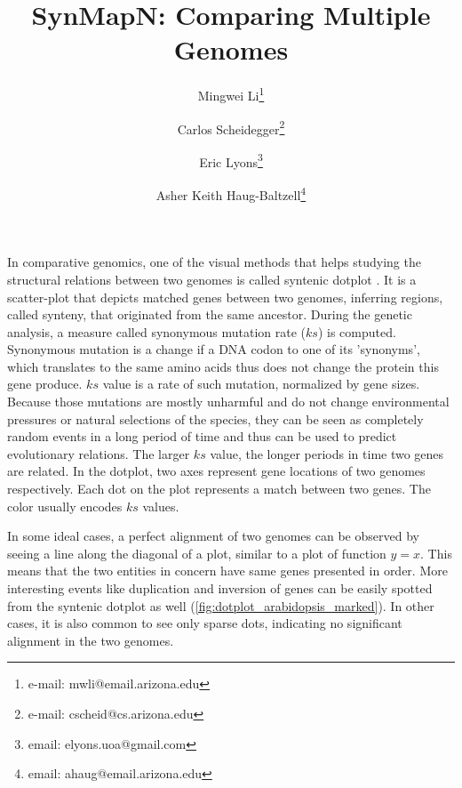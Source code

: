 \documentclass{vgtc}                      %
\title{SynMapN: Comparing Multiple Genomes}
\author{
Mingwei Li\thanks{e-mail: mwli@email.arizona.edu}
\and Carlos Scheidegger\thanks{e-mail: cscheid@cs.arizona.edu}
\and Eric Lyons\thanks{email: elyons.uoa@gmail.com}
\and Asher Keith Haug-Baltzell\thanks{email: ahaug@email.arizona.edu}
}
\affiliation{\scriptsize University of Arizona}
\begin{document}
\maketitle
In comparative genomics, one of the visual methods that helps studying the structural relations between two genomes is called syntenic dotplot \cite{syntenic_dotplot, synmap}.
It is a scatter-plot that depicts matched genes between two genomes, inferring regions, called synteny, that originated from the same ancestor. During the genetic analysis, a measure called synonymous mutation rate ($ks$) is computed. Synonymous mutation is a change if a DNA codon to one of its 'synonyms', which translates to the same amino acids thus does not change the protein this gene produce. $ks$ value is a rate of such mutation, normalized by gene sizes. Because those mutations are mostly unharmful and do not change environmental pressures or natural selections of the species, they can be seen as completely random events in a long period of time and thus can be used to predict evolutionary relations. The larger $ks$ value, the longer periods in time two genes are related.
In the dotplot, two axes represent gene locations of two genomes respectively. Each dot on the plot represents a match between two genes. The color usually encodes $ks$ values.

In some ideal cases, a perfect alignment of two genomes can be observed by seeing a line along the diagonal of a plot, similar to a plot of function $y=x$. This means that the two entities in concern have same genes presented in order. More interesting events like duplication and inversion of genes can be easily spotted from the syntenic dotplot as well (\autoref{fig:dotplot_arabidopsis_marked}). In other cases, it is also common to see only sparse dots, indicating no significant alignment in the two genomes.
\end{document}

